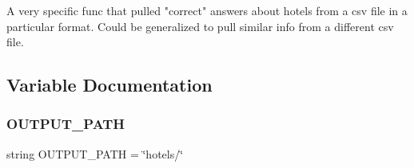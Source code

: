 \begin{DoxyVerb}A very specific func that pulled "correct" answers about hotels from a csv
file in a particular format. Could be generalized to pull similar info from
a different csv file.
\end{DoxyVerb}
 

\subsection{Variable Documentation}
\mbox{\label{namespacedynamicfilterapp_1_1simulation__files_1_1pullanswers_a04644ded1d5e3fc8bd58a411209b7886}} 
\subsubsection{\texorpdfstring{OUTPUT\_PATH}{OUTPUT\_PATH}}
{\footnotesize\ttfamily string O\+U\+T\+P\+U\+T\+\_\+\+P\+A\+TH = \char`\"{}hotels/\char`\"{}}

